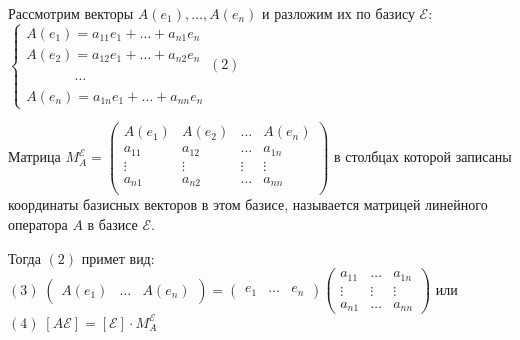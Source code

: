 \documentclass[../main.tex]{subfiles}
\begin{document}
Рассмотрим векторы $A(e_{1}),\dots,A(e_{n})$ и разложим их по базису $\mathcal{E}$: 
$\begin{cases}
    A(e_{1}) = a_{11}e_{1}+\dots+a_{n1}e_{n}\\
    A(e_{2}) = a_{12}e_{1}+\dots+a_{n2}e_{n}\\
    \phantom{A(e_{n})}\dots\\
    A(e_{n}) = a_{1n}e_{1}+\dots+a_{nn}e_{n}
\end{cases}(2)$ 
\begin{definition}
    Матрица $M_{A}^{\mathcal{E}}=\begin{pmatrix}
        A(e_{1})& A(e_{2}) & \dots & A(e_{n}) \\ \hline 
        a_{11} & a_{12} & \dots & a_{1n}\\ 
        \vdots & \vdots & \vdots & \vdots\\
        a_{n1} & a_{n2} & \dots & a_{nn}\\ 
        
    \end{pmatrix}$ в столбцах которой записаны координаты базисных векторов в этом базисе, называется матрицей линейного оператора $A$ в базисе $\mathcal{E}$.
\end{definition}
\noindent Тогда $(2)$ примет вид: $(3)\; \begin{pmatrix}
    A(e_{1}) & \dots & A(e_{n})
\end{pmatrix}= \begin{pmatrix}
    e_{1}& \dots & e_{n}
\end{pmatrix} \begin{pmatrix}
    a_{11} & \dots & a_{1n}\\   
    \vdots & \vdots & \vdots\\
    a_{n1} & \dots & a_{nn}
\end{pmatrix}$ или $(4)\;[A\mathcal{E}]=[\mathcal{E}]\cdot M_{A}^{\mathcal{E}}$
\end{document}
